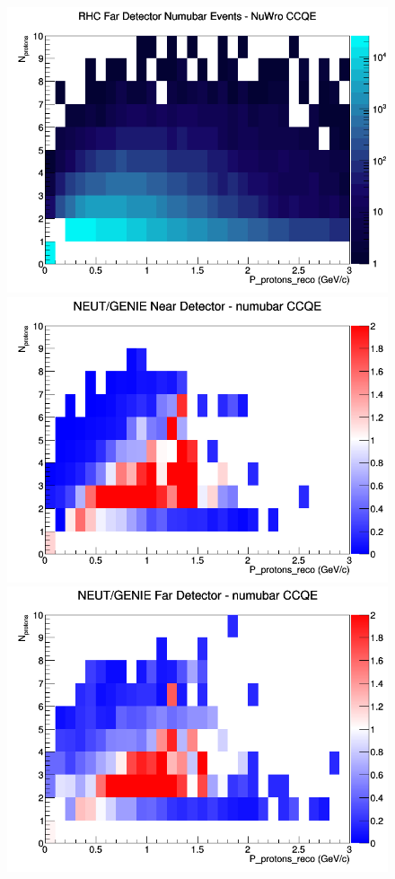 \documentclass[12pt]{article}
\begin{document}
\begin{figure}[h]
\endminipage
{}
\includegraphics[width=\linewidth]{eff_N_P/GAr/protons/CCQE_RHC_FD_numubar_N_P_NuWro.png}
\endminipage
\newline
{}
\includegraphics[width=\linewidth]{eff_N_P/GAr/protons/ratios/CCQE_NEUT_GENIE_numubar_near_N_P.png}
\endminipage
{}
\includegraphics[width=\linewidth]{eff_N_P/GAr/protons/ratios/CCQE_NEUT_GENIE_numubar_far_N_P.png}

\end{figure}
\end{document}
